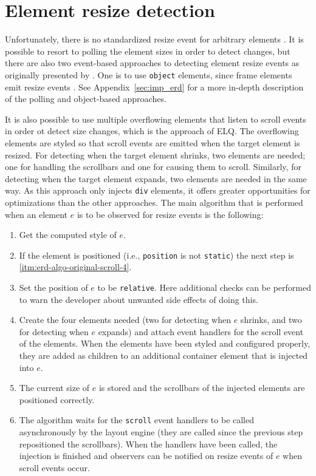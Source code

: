 \documentclass{llncs}
\newcommand{\code}[1]{\texttt{#1}}
\newcommand{\elq}{ELQ}
\begin{document}
\section{Element resize detection}\label{sec:imp}
  Unfortunately, there is no standardized resize event for arbitrary elements \cite{w3c_dom2_events}.
  It is possible to resort to polling the element sizes in order to detect changes, but there are also two event-based approaches to detecting element resize events as originally presented by \cite{backalley}.
  One is to use \code{object} elements, since frame elements emit resize events \cite{elq-thesis}.
  See Appendix~\ref{sec:imp_erd} for a more in-depth description of the polling and object-based approaches.

  It is also possible to use multiple overflowing elements that listen to scroll events in order ot detect size changes, which is the approach of \elq{}.
  The overflowing elements are styled so that scroll events are emitted when the target element is resized.
  For detecting when the target element shrinks, two elements are needed; one for handling the scrollbars and one for causing them to scroll.
  Similarly, for detecting when the target element expands, two elements are needed in the same way.
  As this approach only injects \code{div} elements, it offers greater opportunities for optimizations than the other approaches.
  The main algorithm that is performed when an element $e$ is to be observed for resize events is the following:
  \begin{enumerate}
    \item\label{itm:erd-algo-original-scroll-1} Get the computed style of $e$.
    \item\label{itm:erd-algo-original-scroll-2} If the element is positioned (i.e., \code{position} is not \code{static}) the next step is \ref{itm:erd-algo-original-scroll-4}.
    \item\label{itm:erd-algo-original-scroll-3} Set the position of $e$ to be \code{relative}. Here additional checks can be performed to warn the developer about unwanted side effects of doing this.
    \item\label{itm:erd-algo-original-scroll-4} Create the four elements needed (two for detecting when $e$ shrinks, and two for detecting when $e$ expands) and attach event handlers for the scroll event of the elements.
                                                When the elements have been styled and configured properly, they are added as children to an additional container element that is injected into $e$.
    \item\label{itm:erd-algo-original-scroll-5} The current size of $e$ is stored and the scrollbars of the injected elements are positioned correctly.
    \item\label{itm:erd-algo-original-scroll-6} The algorithm waits for the \code{scroll} event handlers to be called asynchronously by the layout engine (they are called since the previous step repositioned the scrollbars).
                                                When the handlers have been called, the injection is finished and observers can be notified on resize events of $e$ when scroll events occur.
  \end{enumerate}
\end{document}
